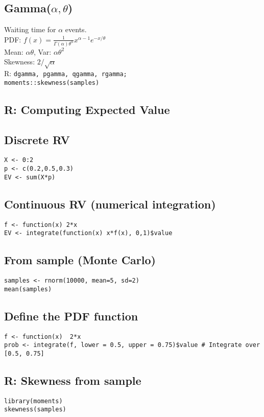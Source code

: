 \documentclass[7pt,landscape]{article}
\begin{document}
\begin{multicols}{3}
\subsection*{Gamma($\alpha,\theta$)}
Waiting time for $\alpha$ events. \\
PDF: $f(x)=\tfrac{1}{\Gamma(\alpha)\theta^\alpha} x^{\alpha-1} e^{-x/\theta}$ \\
Mean: $\alpha\theta$, Var: $\alpha\theta^2$ \\
Skewness: $2/\sqrt{\alpha}$ \\
R: \texttt{dgamma, pgamma, qgamma, rgamma; \\
moments::skewness(samples)}

\subsection*{R: Computing Expected Value}

\subsection*{Discrete RV}
\texttt{X <- 0:2} \\
\texttt{p <- c(0.2,0.5,0.3)} \\
\texttt{EV <- sum(X*p)} \\

\subsection*{Continuous RV (numerical integration)}
\texttt{f <- function(x) 2*x} \\
\texttt{EV <- integrate(function(x) x*f(x), 0,1)\$value} \\

\subsection*{From sample (Monte Carlo)}
\texttt{samples <- rnorm(10000, mean=5, sd=2)} \\
\texttt{mean(samples)}  %

\subsection*{Define the PDF function}

\texttt{f <- function(x) { 2*x }} \\
\texttt{prob <- integrate(f, lower = 0.5, upper = 0.75)\$value \# Integrate over [0.5, 0.75]}



\subsection*{R: Skewness from sample}
\texttt{library(moments)} \\
\texttt{skewness(samples)}


\end{multicols}
\end{document}
